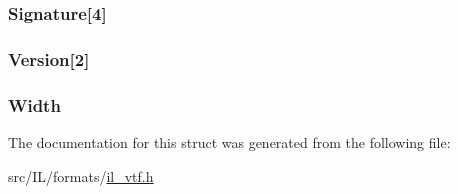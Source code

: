 \hypertarget{struct_v_t_f_h_e_a_d_a5bac2a1102eda8a6453823b7be892818}{
\subsubsection[{Signature}]{ Signature\mbox{[}4\mbox{]}}}\label{struct_v_t_f_h_e_a_d_a5bac2a1102eda8a6453823b7be892818}
\hypertarget{struct_v_t_f_h_e_a_d_ac464344a53bfc3d6cd4e75e2366c8b99}{
\subsubsection[{Version}]{ Version\mbox{[}2\mbox{]}}}\label{struct_v_t_f_h_e_a_d_ac464344a53bfc3d6cd4e75e2366c8b99}
\hypertarget{struct_v_t_f_h_e_a_d_aed0f0a923b8346ba51a4de45fff77ee7}{
\subsubsection[{Width}]{ Width}}\label{struct_v_t_f_h_e_a_d_aed0f0a923b8346ba51a4de45fff77ee7}


The documentation for this struct was generated from the following file\-:\begin{DoxyCompactItemize}
\item 
src/\-I\-L/formats/\hyperlink{il__vtf_8h}{il\-\_\-vtf.\-h}\end{DoxyCompactItemize}
